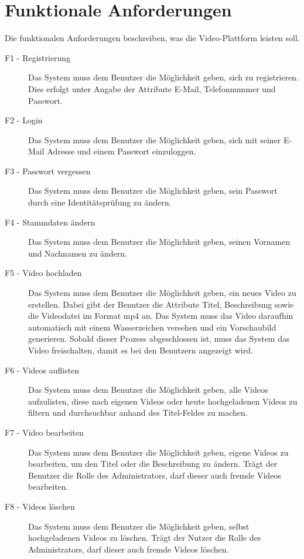 \section{Funktionale Anforderungen}

Die funktionalen Anforderungen beschreiben, was die Video-Plattform leisten soll.

\begin{description}
   \item[F1 - Registrierung] Das System muss dem Benutzer die Möglichkeit geben, sich zu registrieren. Dies erfolgt unter Angabe der Attribute E-Mail, Telefonnummer und Passwort.
   \item[F2 - Login] Das System muss dem Benutzer die Möglichkeit geben, sich mit seiner E-Mail Adresse und einem Passwort einzuloggen.
   \item[F3 - Passwort vergessen] Das System muss dem Benutzer die Möglichkeit geben, sein Passwort durch eine Identitätsprüfung zu ändern.
   \item[F4 - Stammdaten ändern] Das System muss dem Benutzer die Möglichkeit geben, seinen Vornamen und Nachnamen zu ändern.
   \item[F5 - Video hochladen] Das System muss dem Benutzer die Möglichkeit geben, ein neues Video zu erstellen. Dabei gibt der Benutzer die Attribute Titel, Beschreibung sowie die Videodatei im Format mp4 an. Das System muss das Video daraufhin automatisch mit einem Wasserzeichen versehen und ein Vorschaubild generieren. Sobald dieser Prozess abgeschlossen ist, muss das System das Video freischalten, damit es bei den Benutzern angezeigt wird.
   \item[F6 - Videos auflisten] Das System muss dem Benutzer die Möglichkeit geben, alle Videos aufzulisten, diese nach eigenen Videos oder heute hochgeladenen Videos zu filtern und durchsuchbar anhand des Titel-Feldes zu machen.
   \item[F7 - Video bearbeiten] Das System muss dem Benutzer die Möglichkeit geben, eigene Videos zu bearbeiten, um den Titel oder die Beschreibung zu ändern. Trägt der Benutzer die Rolle des Administrators, darf dieser auch fremde Videos bearbeiten.
   \item[F8 - Videos löschen] Das System muss dem Benutzer die Möglichkeit geben, selbst hochgeladenen Videos zu löschen. Trägt der Nutzer die Rolle des Administrators, darf dieser auch fremde Videos löschen.
\end{description}